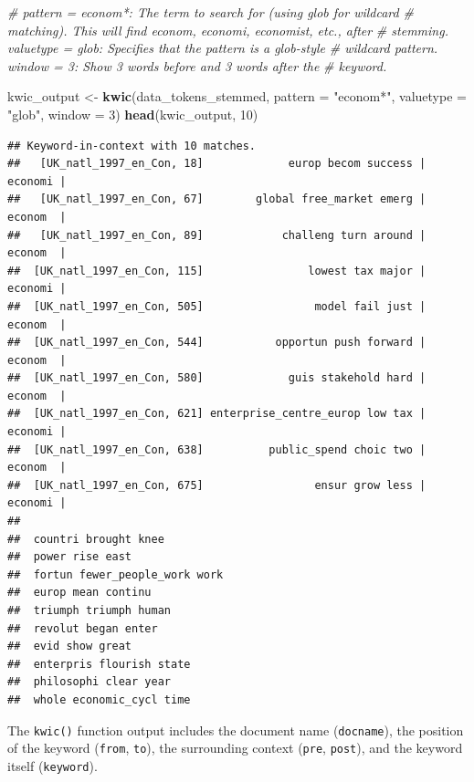 \documentclass[
]{book}
\newenvironment{Shaded}{\begin{snugshade}}{\end{snugshade}}
\newcommand{\AttributeTok}[1]{\textcolor[rgb]{0.13,0.29,0.53}{#1}}
\newcommand{\CommentTok}[1]{\textcolor[rgb]{0.56,0.35,0.01}{\textit{#1}}}
\newcommand{\DecValTok}[1]{\textcolor[rgb]{0.00,0.00,0.81}{#1}}
\newcommand{\FunctionTok}[1]{\textcolor[rgb]{0.13,0.29,0.53}{\textbf{#1}}}
\newcommand{\NormalTok}[1]{#1}
\newcommand{\OtherTok}[1]{\textcolor[rgb]{0.56,0.35,0.01}{#1}}
\newcommand{\StringTok}[1]{\textcolor[rgb]{0.31,0.60,0.02}{#1}}
\begin{document}
\begin{Shaded}
\begin{Highlighting}[]
\CommentTok{\# pattern = \textquotesingle{}econom*\textquotesingle{}: The term to search for (using glob for wildcard}
\CommentTok{\# matching). This will find \textquotesingle{}econom\textquotesingle{}, \textquotesingle{}economi\textquotesingle{}, \textquotesingle{}economist\textquotesingle{}, etc., after}
\CommentTok{\# stemming.  valuetype = \textquotesingle{}glob\textquotesingle{}: Specifies that the pattern is a glob{-}style}
\CommentTok{\# wildcard pattern.  window = 3: Show 3 words before and 3 words after the}
\CommentTok{\# keyword.}

\NormalTok{kwic\_output }\OtherTok{\textless{}{-}} \FunctionTok{kwic}\NormalTok{(data\_tokens\_stemmed, }\AttributeTok{pattern =} \StringTok{"econom*"}\NormalTok{, }\AttributeTok{valuetype =} \StringTok{"glob"}\NormalTok{,}
    \AttributeTok{window =} \DecValTok{3}\NormalTok{)}
\FunctionTok{head}\NormalTok{(kwic\_output, }\DecValTok{10}\NormalTok{)}
\end{Highlighting}
\end{Shaded}

\begin{verbatim}
## Keyword-in-context with 10 matches.                                                                       
##   [UK_natl_1997_en_Con, 18]             europ becom success | economi |
##   [UK_natl_1997_en_Con, 67]        global free_market emerg | econom  |
##   [UK_natl_1997_en_Con, 89]            challeng turn around | econom  |
##  [UK_natl_1997_en_Con, 115]                lowest tax major | economi |
##  [UK_natl_1997_en_Con, 505]                 model fail just | econom  |
##  [UK_natl_1997_en_Con, 544]           opportun push forward | econom  |
##  [UK_natl_1997_en_Con, 580]             guis stakehold hard | econom  |
##  [UK_natl_1997_en_Con, 621] enterprise_centre_europ low tax | economi |
##  [UK_natl_1997_en_Con, 638]          public_spend choic two | econom  |
##  [UK_natl_1997_en_Con, 675]                 ensur grow less | economi |
##                               
##  countri brought knee         
##  power rise east              
##  fortun fewer_people_work work
##  europ mean continu           
##  triumph triumph human        
##  revolut began enter          
##  evid show great              
##  enterpris flourish state     
##  philosophi clear year        
##  whole economic_cycl time
\end{verbatim}

The \texttt{kwic()} function output includes the document name (\texttt{docname}), the position of the keyword (\texttt{from}, \texttt{to}), the surrounding context (\texttt{pre}, \texttt{post}), and the keyword itself (\texttt{keyword}).
\end{document}

